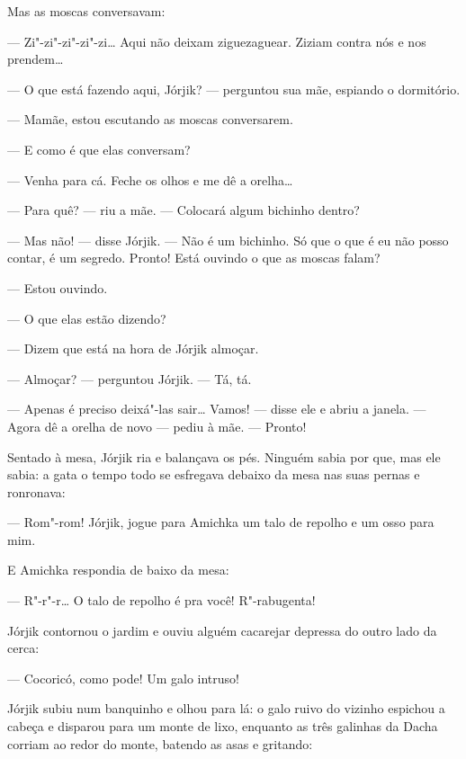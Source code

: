 Mas as moscas conversavam:

--- Zi"-zi"-zi"-zi"-zi\ldots{} Aqui não deixam ziguezaguear. Ziziam contra nós e
nos prendem\ldots{}

--- O que está fazendo aqui, Jórjik? --- perguntou sua mãe, espiando o
dormitório.

--- Mamãe, estou escutando as moscas conversarem.

--- E como é que elas conversam?

--- Venha para cá. Feche os olhos e me dê a orelha\ldots{}

--- Para quê? --- riu a mãe. --- Colocará algum bichinho dentro?

--- Mas não! --- disse Jórjik. --- Não é um bichinho. Só que o que é eu
não posso contar, é um segredo. Pronto! Está ouvindo o que as moscas
falam?

--- Estou ouvindo.

--- O que elas estão dizendo?

--- Dizem que está na hora de Jórjik almoçar.

--- Almoçar? --- perguntou Jórjik. --- Tá, tá.

--- Apenas é preciso deixá"-las sair\ldots{} Vamos! --- disse ele e abriu a
janela. --- Agora dê a orelha de novo --- pediu à mãe. --- Pronto!

Sentado à mesa, Jórjik ria e balançava os pés. Ninguém sabia por que,
mas ele sabia: a gata o tempo todo se esfregava debaixo da mesa nas suas
pernas e ronronava:

--- Rom"-rom! Jórjik, jogue para Amichka um talo de repolho e um osso
para mim.

E Amichka respondia de baixo da mesa:

--- R"-r"-r\ldots{} O talo de repolho é pra você! R"-rabugenta!


Jórjik contornou o jardim e ouviu alguém cacarejar depressa do outro
lado da cerca:

--- Cocoricó, como pode! Um galo intruso!

Jórjik subiu num banquinho e olhou para lá: o galo ruivo do vizinho
espichou a cabeça e disparou para um monte de lixo, enquanto as três
galinhas da Dacha corriam ao redor do monte, batendo as asas e gritando:

